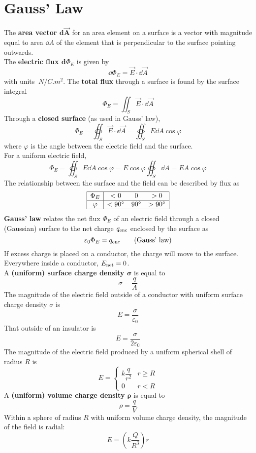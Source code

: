 \documentclass[./Electricity and Magnetism.tex]{subfiles}
\begin{document}
	\section{Gauss' Law}
		The \textbf{area vector \(\bm{\text{d}{\vec{A}}}\)} for an area element on a surface is a vector with magnitude equal to area \(\dd{A}\) of the element that is perpendicular to the surface pointing outwards. \\
		The \textbf{electric flux \({\bm{\text{d}}{\Phi_E}}\)} is given by
			\[\dd{\Phi_E} = \vec{E} \cdot \dd{\vec{A}} \tag{electric flux}\]
			with units \(\SI{}{N/C.m^2}\).
			The \textbf{total flux} through a surface is found by the surface integral
				\[\Phi_E = \iint_S \vec{E} \cdot \dd{\vec{A}} \tag{total flux}\]
			Through a \textbf{closed surface} (as used in Gauss' law),
				\[\Phi_E = \oiint_S \vec{E} \cdot \dd{\vec{A}} = \oiint_S E\dd{A}\cos\varphi \tag{net flux}\]
				where \(\varphi\) is the angle between the electric field and the surface. \\
				For a uniform electric field,
				\[\Phi_E = \oiint_S E \dd{A} \cos\varphi = E\cos\varphi\oiint_S \dd{A} = EA\cos\varphi \]
			The relationship between the surface and the field can be described by flux as
			\[
				\begin{array}{|c|ccc|}\hline
					\Phi_E & < 0 & 0 & > 0 \\\hline
					\varphi & < 90^\circ & 90^\circ & > 90^\circ \\\hline
				\end{array}
			\]
		\textbf{Gauss' law} relates the net flux \(\Phi_E\) of an electric field through a closed (Gaussian) surface to the net charge \(q_{\text{enc}}\) enclosed by the surface as
			\[\varepsilon_0\Phi_E = q_{\text{enc}} \tag{Gauss' law}\]
		If excess charge is placed on a conductor, the charge will move to the surface. \\
		Everywhere inside a conductor, \(E_{\text{net}} = 0\). \\	
		A \textbf{(uniform) surface charge density \(\bm{\sigma}\)} is equal to
			\[\sigma = \frac{q}{A} \tag{uniform surface charge density}\]
		The magnitude of the electric field outside of a conductor with uniform surface charge density \(\sigma\) is
			\[E = \frac{\sigma}{\varepsilon_0} \tag{conducting surface}\]
			That outside of an insulator is
			\[E = \frac{\sigma}{2\varepsilon_0} \tag{insulator}\]
		The magnitude of the electric field produced by a uniform spherical shell of radius \(R\) is
			\[
				E = \begin{cases}
 					k\dfrac{q}{r^2} & r \ge R \\
 					0 & r < R
 				\end{cases}
			\]
		A \textbf{(uniform) volume charge density \(\bm{\rho}\)} is equal to
			\[\rho = \frac{q}{V} \tag{uniform volume charge density}\]
		Within a sphere of radius \(R\) with uniform volume charge density, the magnitude of the field is radial:
			\[E = \left(k\frac{Q}{R^3}\right)r \tag{uniform charge, field at \(r \le R\)}\]
\end{document}
